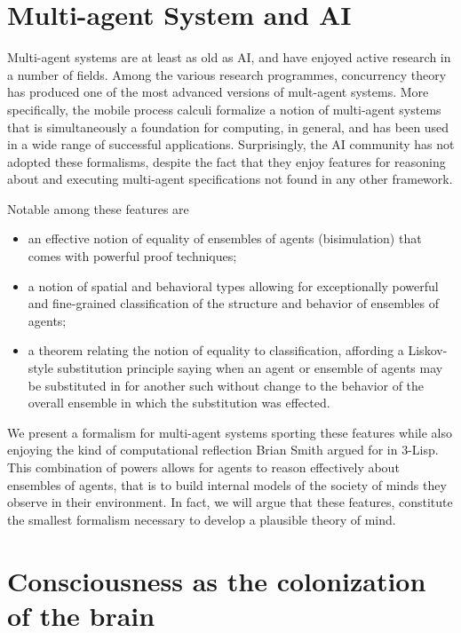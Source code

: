 \documentclass[runningheads]{llncs}
\begin{document}


\section{Multi-agent System and AI}
Multi-agent systems are at least as old as AI, and have enjoyed active
research in a number of fields. Among the various research programmes,
concurrency theory has produced one of the most advanced versions of
mult-agent systems. More specifically, the mobile process calculi
formalize a notion of multi-agent systems that is simultaneously a
foundation for computing, in general, and has been used in a wide
range of successful applications. Surprisingly, the AI community has
not adopted these formalisms, despite the fact that they enjoy
features for reasoning about and executing multi-agent specifications
not found in any other framework.

Notable among these features are
\begin{itemize}
  \item an effective notion of equality of ensembles of agents
    (bisimulation) that comes with powerful proof techniques;
  \item a notion of spatial and behavioral types allowing for
    exceptionally powerful and fine-grained classification of the
    structure and behavior of ensembles of agents;
  \item a theorem relating the notion of equality to classification,
    affording a Liskov-style substitution principle saying when an
    agent or ensemble of agents may be substituted in for another such
    without change to the behavior of the overall ensemble in which
    the substitution was effected.
\end{itemize}

We present a formalism for multi-agent systems sporting these features
while also enjoying the kind of computational reflection Brian Smith
argued for in 3-Lisp. This combination of powers allows for agents to
reason effectively about ensembles of agents, that is to build
internal models of the society of minds they observe in their
environment. In fact, we will argue that these features, constitute
the smallest formalism necessary to develop a plausible theory of
mind.



\vspace{1\baselineskip}
\section{Consciousness as the colonization of the brain}
\end{document}
